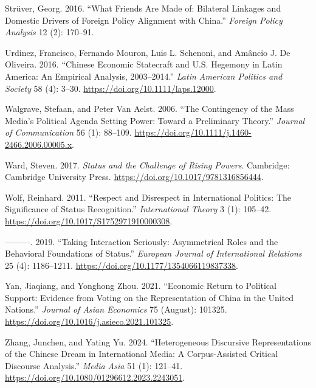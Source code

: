 \documentclass[
  12pt,
]{article}
\newlength{\cslhangindent}
\newenvironment{CSLReferences}[2] %
 {\begin{list}{}{%
  \setlength{\itemindent}{0pt}
  \setlength{\leftmargin}{0pt}
  \setlength{\parsep}{0pt}
  \ifodd #1
   \setlength{\leftmargin}{\cslhangindent}
   \setlength{\itemindent}{-1\cslhangindent}
  \fi
  \setlength{\itemsep}{#2\baselineskip}}}
 {\end{list}}
\begin{document}
\begin{CSLReferences}{1}{0}
Strüver, Georg. 2016. {``What Friends Are Made of: {Bilateral} Linkages and Domestic Drivers of Foreign Policy Alignment with {China}.''} \emph{Foreign Policy Analysis} 12 (2): 170--91.

Urdinez, Francisco, Fernando Mouron, Luis L. Schenoni, and Amâncio J. De Oliveira. 2016. {``Chinese {Economic Statecraft} and {U}.{S}. {Hegemony} in {Latin America}: {An Empirical Analysis}, 2003--2014.''} \emph{Latin American Politics and Society} 58 (4): 3--30. \url{https://doi.org/10.1111/laps.12000}.

Walgrave, Stefaan, and Peter Van Aelst. 2006. {``The {Contingency} of the {Mass Media}'s {Political Agenda Setting Power}: {Toward} a {Preliminary Theory}.''} \emph{Journal of Communication} 56 (1): 88--109. \url{https://doi.org/10.1111/j.1460-2466.2006.00005.x}.

Ward, Steven. 2017. \emph{Status and the Challenge of Rising Powers}. Cambridge: Cambridge University Press. \url{https://doi.org/10.1017/9781316856444}.

Wolf, Reinhard. 2011. {``Respect and Disrespect in International Politics: The Significance of Status Recognition.''} \emph{International Theory} 3 (1): 105--42. \url{https://doi.org/10.1017/S1752971910000308}.

---------. 2019. {``Taking Interaction Seriously: {Asymmetrical} Roles and the Behavioral Foundations of Status.''} \emph{European Journal of International Relations} 25 (4): 1186--1211. \url{https://doi.org/10.1177/1354066119837338}.

Yan, Jiaqiang, and Yonghong Zhou. 2021. {``Economic Return to Political Support: {Evidence} from Voting on the Representation of {China} in the {United Nations}.''} \emph{Journal of Asian Economics} 75 (August): 101325. \url{https://doi.org/10.1016/j.asieco.2021.101325}.

Zhang, Junchen, and Yating Yu. 2024. {``Heterogeneous Discursive Representations of the Chinese Dream in International Media: A Corpus-Assisted Critical Discourse Analysis.''} \emph{Media Asia} 51 (1): 121--41. \url{https://doi.org/10.1080/01296612.2023.2243051}.

\end{CSLReferences}
\end{document}

